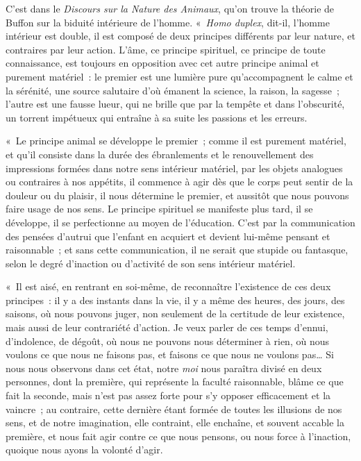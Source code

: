 \documentclass[french,twoside]{book} %
\newcommand\chaptercont{} %
\begin{document}
\chaptercont
\noindent C’est dans le {\itshape Discours sur la Nature des Animaux}, qu’on trouve la théorie de Buffon sur la biduité intérieure de l’homme. « {\itshape Homo duplex}, dit-il, l’homme intérieur est double, il est composé de deux principes différents par leur nature, et contraires par leur action. L’âme, ce principe spirituel, ce principe de toute connaissance, est toujours en opposition avec cet autre principe animal et purement matériel : le premier est une lumière pure qu’accompagnent le calme et la sérénité, une source salutaire d’où émanent la science, la raison, la sagesse ; l’autre est une fausse lueur, qui ne brille que par la tempête et dans l’obscurité, un torrent impétueux qui entraîne à sa suite les passions et les erreurs.\par
« Le principe animal se développe le premier ; comme il est purement matériel, et qu’il consiste dans la durée des ébranlements et le renouvellement des impressions formées dans notre sens intérieur matériel, par les objets analogues ou contraires à nos appétits, il commence à agir dès que le corps peut sentir de la douleur ou du plaisir, il nous détermine le premier, et aussitôt que nous pouvons faire usage de nos sens. Le principe spirituel se manifeste plus tard, il se développe, il se perfectionne au moyen de l’éducation. C’est par la communication des pensées d’autrui que l’enfant en acquiert et devient lui-même pensant et raisonnable ; et sans cette communication, il ne serait que stupide ou fantasque, selon le degré d’inaction ou d’activité de son sens intérieur matériel.\par
« Il est aisé, en rentrant en soi-même, de reconnaître l’existence de ces deux principes : il y a des instants dans la vie, il y a même des heures, des jours, des saisons, où nous pouvons juger, non seulement de la certitude de leur existence, mais aussi de leur contrariété d’action. Je veux parler de ces temps d’ennui, d’indolence, de dégoût, où nous ne pouvons nous déterminer à rien, où nous voulons ce que nous ne faisons pas, et faisons ce que nous ne voulons pas… Si nous nous observons dans cet état, notre {\itshape moi} nous paraîtra divisé en deux personnes, dont la première, qui représente la faculté raisonnable, blâme ce que fait la seconde, mais n’est pas assez forte pour s’y opposer efficacement et la vaincre ; au contraire, cette dernière étant formée de toutes les illusions de nos sens, et de notre imagination, elle contraint, elle enchaîne, et souvent accable la première, et nous fait agir contre ce que nous pensons, ou nous force à l’inaction, quoique nous ayons la volonté d’agir.\par
\end{document}
